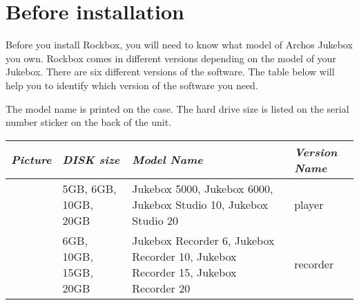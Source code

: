\section{Before installation}

Before you install Rockbox, you will need to know what model of Archos
Jukebox you own.  Rockbox comes in different versions depending on the
model of your Jukebox.  There are six different versions of the
software.  The table below will help you to identify which version of
the software you need.  

The model name is printed on the case.  The hard drive size is listed on
the serial number sticker on the back of the unit.

\begin{minipage}{16.589cm}
\begin{center}\begin{tabular}{|p{1.846cm}|p{5.6280003cm}|p{6.053cm}|p{2.195cm}|}
\hline
{\centering\bfseries\itshape
\label{ref:Jukeboxtypetable}Picture
\par}
&
{\centering\bfseries\itshape
DISK size
\par}
&
{\centering\bfseries\itshape
Model Name 
\par}
&
{\centering\bfseries\itshape
Version Name
\par}
\\\hline
  [Warning: Image ignored] %
 
&
{\centering
5GB, 6GB, 10GB, 20GB
\par}
&
{\centering
Jukebox 5000,\newline
Jukebox 6000,\newline
Jukebox Studio 10,\newline
Jukebox Studio 20
\par}
&
{\centering
player 
\par}
\\\hline
  [Warning: Image ignored] %
 
&
{\centering
6GB, 10GB, 15GB, 20GB
\par}
&
{\centering
Jukebox Recorder 6,\newline
Jukebox Recorder 10,\newline
Jukebox Recorder 15,\newline
Jukebox Recorder 20
\par}
&
{\centering
recorder 
\par}
\\\hline
  [Warning: Image ignored] %
 

\end{tabular}
\end{center}
\end{minipage}
